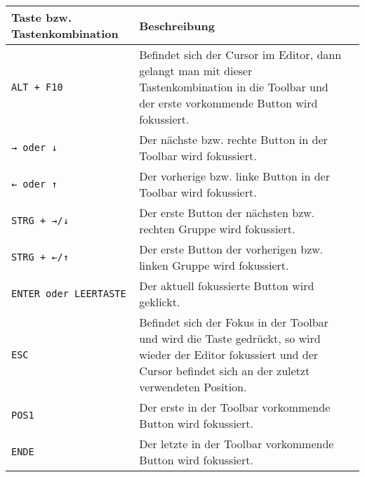 \begin{table}[H]
\begin{tabular}{lp{9cm}l}
\hline
Taste bzw. Tastenkombination & Beschreibung                                                                                                                                                               								\\ \hline
\texttt{ALT + F10} & Befindet sich der Cursor im Editor, dann gelangt man mit dieser Tastenkombination in die Toolbar und der erste vorkommende Button wird fokussiert.                         	\\ \hline
\texttt{→ oder ↓} & Der nächste bzw. rechte Button in der Toolbar wird fokussiert.                                                                                                            							\\ \hline
\texttt{← oder ↑} & Der vorherige bzw. linke Button in der Toolbar wird fokussiert.                                                                                                           						 		\\ \hline
\texttt{STRG + →/↓} & Der erste Button der nächsten bzw. rechten Gruppe wird fokussiert.                                                                                                         						\\ \hline
\texttt{STRG + ←/↑} & Der erste Button der vorherigen bzw. linken Gruppe wird fokussiert.                                                                                                       						\\ \hline
\texttt{ENTER oder LEERTASTE} & Der aktuell fokussierte Button wird geklickt.                                                                                                                              					\\ \hline
\texttt{ESC} & Befindet sich der Fokus in der Toolbar und wird die Taste gedrückt, so wird wieder der Editor fokussiert und der Cursor befindet sich an der zuletzt verwendeten Position. 	\\ \hline
\texttt{POS1} & Der erste in der Toolbar vorkommende Button wird fokussiert.                                                                                                               								\\ \hline
\texttt{ENDE} & Der letzte in der Toolbar vorkommende Button wird fokussiert.                                                                                                              								\\ \hline
\end{tabular}
\end{table}

